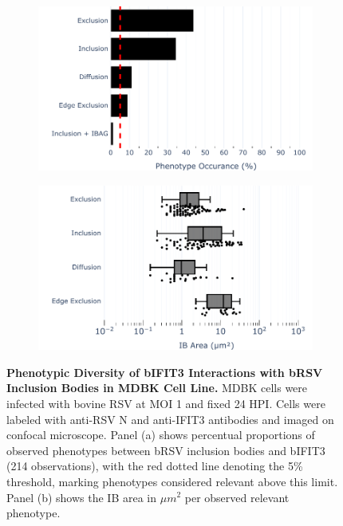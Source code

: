\begin{figure}
    \begin{subfigure}{0.495\textwidth}
        \caption{}
        \includegraphics[width=1\linewidth]{08. Chapter 3/Figs/02. Infection/03. IFIT3/07. bar_i3_mdbk.pdf} 
    \end{subfigure}
    \begin{subfigure}{0.495\textwidth}
        \caption{}
        \includegraphics[width=1\linewidth]{08. Chapter 3/Figs/02. Infection/03. IFIT3/08. box_i3_mdbk.pdf}
    \end{subfigure}
    \caption[Phenotypic Diversity of bIFIT3 Interactions with bRSV Inclusion Bodies in MDBK Cell Line.]{\textbf{Phenotypic Diversity of bIFIT3 Interactions with bRSV Inclusion Bodies in MDBK Cell Line.} MDBK cells were infected with bovine RSV at MOI 1 and fixed 24 HPI. Cells were labeled with anti-RSV N and anti-IFIT3 antibodies and imaged on confocal microscope. Panel (a) shows percentual proportions of observed phenotypes between bRSV inclusion bodies and bIFIT3 (214 observations), with the red dotted line denoting the 5\% threshold, marking phenotypes considered relevant above this limit. Panel (b) shows the IB area in \(\mu m^2\) per observed relevant phenotype.}
    \label{fig:Phenotypic Diversity of bIFIT3 Interactions with bRSV Inclusion Bodies in MDBK Cell Line}
\end{figure}

